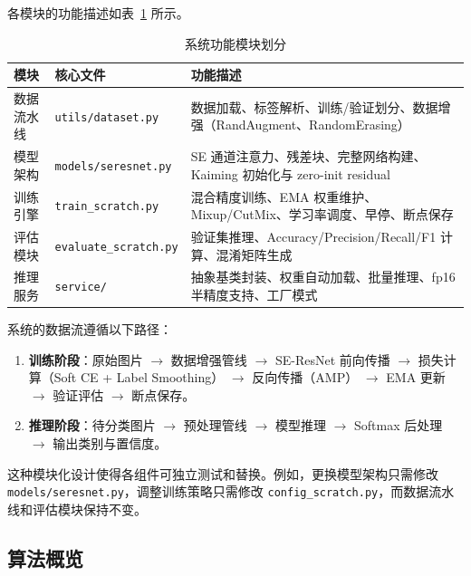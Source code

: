 \documentclass[12pt,a4paper]{ctexart}
\begin{document}
各模块的功能描述如表~\ref{tab:modules} 所示。

\begin{table}[H]
    \centering
    \caption{系统功能模块划分}
    \label{tab:modules}
    \begin{tabular}{p{2.5cm}p{3cm}p{6cm}}
        \toprule
        \textbf{模块} & \textbf{核心文件} & \textbf{功能描述} \\
        \midrule
        数据流水线 & \texttt{utils/dataset.py} & 数据加载、标签解析、训练/验证划分、数据增强（RandAugment、RandomErasing） \\
        模型架构 & \texttt{models/seresnet.py} & SE 通道注意力、残差块、完整网络构建、Kaiming 初始化与 zero-init residual \\
        训练引擎 & \texttt{train\_scratch.py} & 混合精度训练、EMA 权重维护、Mixup/CutMix、学习率调度、早停、断点保存 \\
        评估模块 & \texttt{evaluate\_scratch.py} & 验证集推理、Accuracy/Precision/Recall/F1 计算、混淆矩阵生成 \\
        推理服务 & \texttt{service/} & 抽象基类封装、权重自动加载、批量推理、fp16 半精度支持、工厂模式 \\
        \bottomrule
    \end{tabular}
\end{table}

系统的数据流遵循以下路径：
\begin{enumerate}
    \item \textbf{训练阶段}：原始图片 $\rightarrow$ 数据增强管线 $\rightarrow$ SE-ResNet 前向传播 $\rightarrow$ 损失计算（Soft CE + Label Smoothing） $\rightarrow$ 反向传播（AMP） $\rightarrow$ EMA 更新 $\rightarrow$ 验证评估 $\rightarrow$ 断点保存。
    \item \textbf{推理阶段}：待分类图片 $\rightarrow$ 预处理管线 $\rightarrow$ 模型推理 $\rightarrow$ Softmax 后处理 $\rightarrow$ 输出类别与置信度。
\end{enumerate}

这种模块化设计使得各组件可独立测试和替换。例如，更换模型架构只需修改 \texttt{models/seresnet.py}，调整训练策略只需修改 \texttt{config\_scratch.py}，而数据流水线和评估模块保持不变。

\subsection{算法概览}
\end{document}
